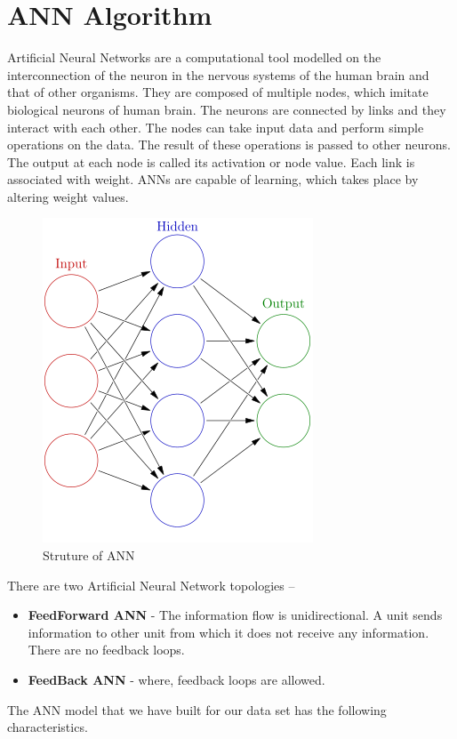 \section{ANN Algorithm}
Artificial Neural Networks are a computational tool modelled on the interconnection of the neuron in the nervous systems of the human brain and that of other organisms. They are composed of multiple nodes, which imitate biological neurons of human brain. The neurons are connected by links and they interact with each other. The nodes can take input data and perform simple operations on the data. The result of these operations is passed to other neurons. The output at each node is called its activation or node value. Each link is associated with weight. ANNs are capable of learning, which takes place by altering weight values.
\begin{figure}[h]
\centering
\includegraphics[scale=1.0]{ann.png}
\caption{\label{fig:subBDDs1}Struture of ANN}
\end{figure}
\par \noindent
There are two Artificial Neural Network topologies –
\begin{itemize}
\item \textbf{FeedForward ANN} - The information flow is unidirectional. A unit sends information to other unit from which it does not receive any information. There are no feedback loops.
\item \textbf{FeedBack ANN} - where, feedback loops are allowed.
\end{itemize}
\par \noindent
The ANN model that we have built for our data set has the following characteristics.
